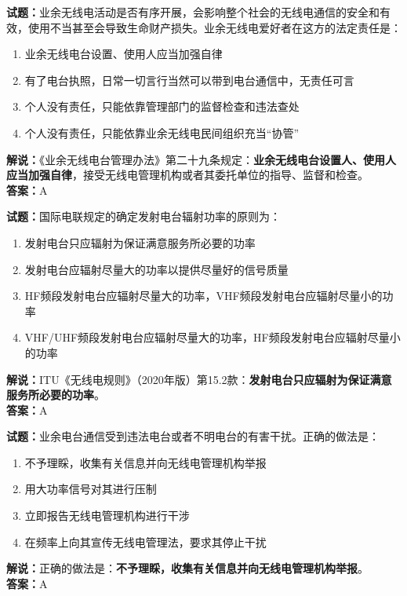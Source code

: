 \documentclass{ctexbook}
\begin{document}
\bigskip

\noindent\textbf{试题：}业余无线电活动是否有序开展，会影响整个社会的无线电通信的安全和有效，使用不当甚至会导致生命财产损失。业余无线电爱好者在这方的法定责任是：
\begin{enumerate}[leftmargin=3em]
  \item 业余无线电台设置、使用人应当加强自律
  \item 有了电台执照，日常一切言行当然可以带到电台通信中，无责任可言
  \item 个人没有责任，只能依靠管理部门的监督检查和违法查处
  \item 个人没有责任，只能依靠业余无线电民间组织充当“协管”
\end{enumerate}
\noindent\textbf{解说：}《业余无线电台管理办法》第二十九条规定：\textbf{业余无线电台设置人、使用人应当加强自律}，接受无线电管理机构或者其委托单位的指导、监督和检查。\\\noindent\textbf{答案：}A

\bigskip

\noindent\textbf{试题：}国际电联规定的确定发射电台辐射功率的原则为：
\begin{enumerate}[leftmargin=3em]
  \item 发射电台只应辐射为保证满意服务所必要的功率
  \item 发射电台应辐射尽量大的功率以提供尽量好的信号质量
  \item HF频段发射电台应辐射尽量大的功率，VHF频段发射电台应辐射尽量小的功率
  \item VHF/UHF频段发射电台应辐射尽量大的功率，HF频段发射电台应辐射尽量小的功率
\end{enumerate}
\noindent\textbf{解说：}ITU《无线电规则》（2020年版）第15.2款：\textbf{发射电台只应辐射为保证满意服务所必要的功率}。\\\noindent\textbf{答案：}A

\bigskip

\noindent\textbf{试题：}业余电台通信受到违法电台或者不明电台的有害干扰。正确的做法是：
\begin{enumerate}[leftmargin=3em]
  \item 不予理睬，收集有关信息并向无线电管理机构举报
  \item 用大功率信号对其进行压制
  \item 立即报告无线电管理机构进行干涉
  \item 在频率上向其宣传无线电管理法，要求其停止干扰
\end{enumerate}
\noindent\textbf{解说：}正确的做法是：\textbf{不予理睬，收集有关信息并向无线电管理机构举报}。\\\noindent\textbf{答案：}A
\end{document}
